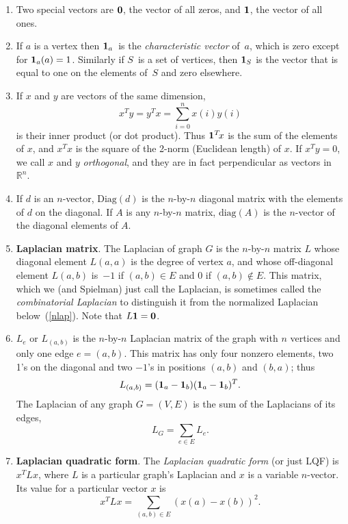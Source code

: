 \documentclass[11pt]{article}
\newcommand{\m}[1]{{\bf{#1}}}       %
\newcommand{\ones}{\m1}             %
\newcommand{\zeros}{\m0}            %
\newcommand{\diag}{\mbox{diag}}
\newcommand{\Diag}{\mbox{Diag}}
\newcommand{\Real}{\mathbb{R}}          %
\begin{document}
\begin{enumerate}
\item
Two special vectors are $\zeros$, the vector of all zeros,
and $\ones$, the vector of all ones.

\item
If $a$ is a vertex then $\ones_a$~is the 
{\em characteristic vector} of~$a$, which
is zero except for $\ones_a(a)=1$.
Similarly if $S$~is a set of vertices, 
then $\ones_S$ is the vector that is equal to one
on the elements of~$S$ and zero elsewhere.

\item
If $x$ and $y$ are vectors of the same dimension, 
$$x^Ty = y^Tx = \sum_{i=0}^{n}x(i)y(i)$$
is their inner product (or dot product).
Thus $\ones^T\!x$ is the sum of the elements of $x$,
and $x^Tx$ is the square of the 2-norm (Euclidean length) of $x$.
If $x^Ty=0$, we call $x$ and $y$ {\em orthogonal}, 
and they are in fact perpendicular as vectors in $\Real^n$.

\item
If $d$ is an $n$-vector, $\Diag(d)$ is the $n$-by-$n$ diagonal 
matrix with the elements of $d$ on the diagonal.
If $A$ is any $n$-by-$n$ matrix, $\diag(A)$ is the $n$-vector
of the diagonal elements of $A$.

\item\label{lap}{\bf Laplacian matrix}.
The Laplacian of graph $G$ is the $n$-by-$n$ matrix $L$
whose diagonal element $L(a,a)$ is the degree of vertex $a$, 
and whose off-diagonal element $L(a,b)$ is~$-1$ if $(a,b) \in E$ 
and $0$ if $(a,b) \notin E$.
This matrix, which we (and Spielman) just call the Laplacian,
is sometimes called the {\em combinatorial Laplacian} to 
distinguish it from the normalized Laplacian below~(\ref{nlap}).
Note that $ L\ones = \zeros$.

\item
$L_e$ or $L_{(a,b)}$ is the $n$-by-$n$ Laplacian matrix
of the graph with $n$ vertices and only one edge $e = (a,b)$.
This matrix has only four nonzero elements, two 1's on the
diagonal and two $-1$'s in positions $(a,b)$ and $(b,a)$;
thus 
$$L_{(a,b)}=(\ones_a-\ones_b)(\ones_a-\ones_b)^T.$$
The Laplacian of any graph $G=(V,E)$ is the sum of the Laplacians
of its edges,
$$L_G = \sum_{e\in E} L_e.$$

\item\label{LQF}{\bf Laplacian quadratic form}.
The {\em Laplacian quadratic form} (or just LQF) is $x^TLx$,
where $L$ is a particular graph's Laplacian and $x$ is a variable $n$-vector.
Its value for a particular vector $x$ is 
$$x^TLx = \sum_{(a,b)\in E}(x(a)-x(b))^2.$$


\end{enumerate}
\end{document}
